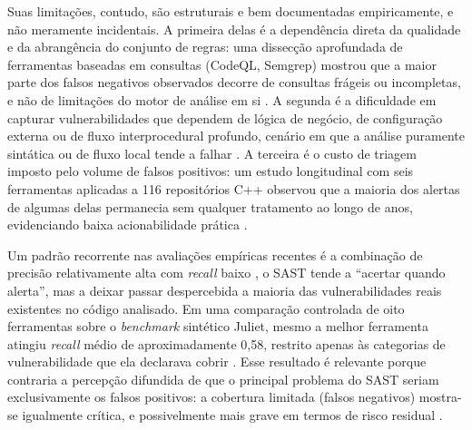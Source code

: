 Suas limitações, contudo, são estruturais e bem documentadas empiricamente, e não meramente incidentais. A primeira delas é a dependência direta da qualidade e da abrangência do conjunto de regras: uma dissecção aprofundada de ferramentas baseadas em consultas (CodeQL, Semgrep) mostrou que a maior parte dos falsos negativos observados decorre de consultas frágeis ou incompletas, e não de limitações do motor de análise em si \cite{Li2024SASTCC}. A segunda é a dificuldade em capturar vulnerabilidades que dependem de lógica de negócio, de configuração externa ou de fluxo interprocedural profundo, cenário em que a análise puramente sintática ou de fluxo local tende a falhar \cite{Zhu2024SASTAndroid}. A terceira é o custo de triagem imposto pelo volume de falsos positivos: um estudo longitudinal com seis ferramentas aplicadas a 116 repositórios C++ observou que a maioria dos alertas de algumas delas permanecia sem qualquer tratamento ao longo de anos, evidenciando baixa acionabilidade prática \cite{Aloraini2019SASTWarnings}.

Um padrão recorrente nas avaliações empíricas recentes é a combinação de precisão relativamente alta com \textit{recall} baixo , o SAST tende a ``acertar quando alerta'', mas a deixar passar despercebida a maioria das vulnerabilidades reais existentes no código analisado. Em uma comparação controlada de oito ferramentas sobre o \textit{benchmark} sintético Juliet, mesmo a melhor ferramenta atingiu \textit{recall} médio de aproximadamente 0,58, restrito apenas às categorias de vulnerabilidade que ela declarava cobrir \cite{Esposito2024SASTComparison}. Esse resultado é relevante porque contraria a percepção difundida de que o principal problema do SAST seriam exclusivamente os falsos positivos: a cobertura limitada (falsos negativos) mostra-se igualmente crítica, e possivelmente mais grave em termos de risco residual \cite{Esposito2024SASTComparison, Li2023SASTJava}.

